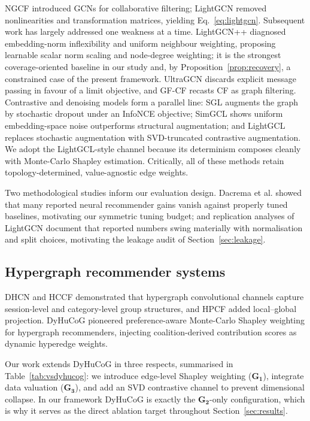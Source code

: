 \documentclass[final,5p,times,twocolumn]{elsarticle}
\begin{document}
NGCF \citep{wang2019ngcf} introduced GCNs for collaborative filtering;
LightGCN \citep{he2020lightgcn} removed nonlinearities and transformation
matrices, yielding Eq.~\eqref{eq:lightgcn}. Subsequent work has largely
addressed one weakness at a time. LightGCN++ \citep{lee2024lightgcnpp}
diagnosed embedding-norm inflexibility and uniform neighbour weighting,
proposing learnable scalar norm scaling and node-degree weighting; it is the
strongest coverage-oriented baseline in our study and, by
Proposition~\ref{prop:recovery}, a constrained case of the present framework.
UltraGCN \citep{mao2021ultragcn} discards explicit message passing in favour
of a limit objective, and GF-CF \citep{shen2021powerful} recasts CF as graph
filtering. Contrastive and denoising models form a parallel line: SGL
\citep{wu2021sgl} augments the graph by stochastic dropout under an InfoNCE
objective; SimGCL \citep{yu2022simgcl} shows uniform embedding-space noise
outperforms structural augmentation; and LightGCL \citep{cai2023lightgcl}
replaces stochastic augmentation with SVD-truncated contrastive augmentation.
We adopt the LightGCL-style channel because its determinism composes cleanly
with Monte-Carlo Shapley estimation. Critically, all of these methods retain
topology-determined, value-agnostic edge weights.

Two methodological studies inform our evaluation design. Dacrema et al.
\citep{dacrema2019worrying} showed that many reported neural recommender gains
vanish against properly tuned baselines, motivating our symmetric tuning
budget; and replication analyses of LightGCN \citep{peska2023lightgcn}
document that reported numbers swing materially with normalisation and split
choices, motivating the leakage audit of Section~\ref{sec:leakage}.

\subsection{Hypergraph recommender systems}
\label{sec:rw-hyper}

DHCN \citep{xia2021dhcn} and HCCF \citep{xia2022hccf} demonstrated that
hypergraph convolutional channels capture session-level and category-level
group structures, and HPCF \citep{chen2024hpcf} added local--global projection.
DyHuCoG \citep{louhichi2026dyhucog} pioneered preference-aware Monte-Carlo
Shapley weighting for hypergraph recommenders, injecting coalition-derived
contribution scores as dynamic hyperedge weights.

Our work extends DyHuCoG in three respects, summarised in
Table~\ref{tab:vsdyhucog}: we introduce edge-level Shapley weighting
($\mathbf{G_1}$), integrate data valuation ($\mathbf{G_3}$), and add an SVD
contrastive channel to prevent dimensional collapse. In our framework DyHuCoG
is exactly the $\mathbf{G_2}$-only configuration, which is why it serves as the
direct ablation target throughout Section~\ref{sec:results}.
\end{document}

